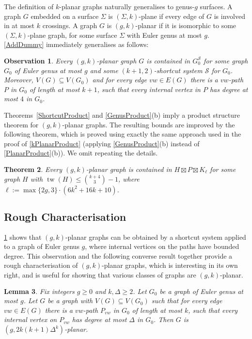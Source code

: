 \documentclass{patmorin}
\theoremstyle{plain}
\newtheorem{thm}{Theorem}
\newtheorem{lem}[thm]{Lemma}
\newtheorem{obs}[thm]{Observation}
\theoremstyle{definition}
\newcommand{\note}[2]{\noindent{\color{red}[#1:~#2]}}
\DeclareMathOperator{\tw}{tw}
\renewcommand{\SS}{\mathcal{S}}
\renewcommand{\geq}{\geqslant}
\renewcommand{\leq}{\leqslant}
\begin{document}
The definition of $k$-planar graphs naturally generalises to genus-$g$ surfaces. A graph $G$ embedded on a surface $\Sigma$ is $(\Sigma,k)$-plane if every edge of $G$ is involved in at most $k$ crossings.  A graph $G$ is $(g,k)$-planar if it is isomorphic to some $(\Sigma,k)$-plane graph, for some surface $\Sigma$ with Euler genus at most $g$. \cref{AddDummy} immediately generalises as follows:

\begin{obs}
\label{gAddDummy}
Every $(g,k)$-planar graph $G$ is contained in $G_0^\SS$ for some graph $G_0$ of Euler genus at most $g$ and some $(k+1,2)$-shortcut system $\SS$ for $G_0$. Moreover, $V(G) \subseteq V(G_0)$ and for every edge $vw \in E(G)$ there is a $vw$-path $P$ in $G_0$ of length at most $k+1$, such that every internal vertex in $P$ has degree at most $4$ in $G_0$.
\end{obs}

Theorems~\ref{ShortcutProduct}  and \ref{GenusProduct}(b) imply a product structure theorem for $(g,k)$-planar graphs. The resulting bounds are improved by the following theorem, which is proved using exactly the same approach used in the proof of \cref{kPlanarProduct} (applying \cref{GenusProduct}(b) instead of \cref{PlanarProduct}(b)). We omit repeating the details.

\begin{thm}
\label{gkPlanarProduct}
Every $(g,k)$-planar graph is contained in $H\boxtimes P \boxtimes K_\ell$ for some graph $H$ with $\tw(H) \leq \binom{k+4}{3}-1$, where $\ell:=\max\{2g,3\}\cdot(6k^2+16k+10)$.
\end{thm}



\subsection{Rough Characterisation}
\label{Characterisation}

\cref{gAddDummy} shows that $(g,k)$-planar graphs can be obtained by a shortcut system applied to a graph of Euler genus $g$, where internal vertices on the paths have bounded degree. This observation and the following converse result together provide a rough characterisation of $(g,k)$-planar graphs, which is interesting in its own right, and is useful for showing that various classes of graphs are $(g,k)$-planar.

\begin{lem}
	\label{DrawG}
	Fix integers $g\geq 0$ and $k,\Delta\geq 2$.
	Let $G_0$ be a graph of Euler genus at most $g$. Let $G$ be
	a graph with $V(G) \subseteq V(G_0)$ such that for every edge $vw \in
	E(G)$ there is a $vw$-path $P_{vw}$ in $G_0$ of length at most $k$, such
	that every internal vertex on $P_{vw}$ has degree at most $\Delta$ in
	$G_0$. Then $G$ is $(g, 2k(k+1)\Delta^{k} )$-planar.
\end{lem}
\end{document}
